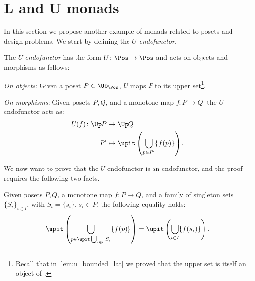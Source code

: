 \section{L and U monads}
In this section we propose another example of monads related to posets and design problems. We start by defining the \emph{$U$ endofunctor}.
\begin{definition}[$U$ endofunctor]
    \label{def:ufunctor}
    The \emph{$U$ endofunctor} has the form $U\colon \Pos \to \Pos$ and acts on objects and morphisms as follows:
    \begin{compactenum}
        \item \emph{On objects}: Given a poset $P\in \Ob_\Pos$, $U$ maps $P$ to its upper set\footnote{Recall that in \cref{lem:u_bounded_lat} we proved that the upper set is itself an object of \Pos.}.
        \item \emph{On morphisms}: Given posets $P,Q$, and a monotone map $f\colon P\to Q$, the $U$ endofunctor acts as:
        \begin{equation}
            \begin{aligned}
                U(f)\colon \Up P&\to \Up Q\\
                P'&\mapsto \upit \left( \bigcup_{p\in P'} \{f(p)\}\right).
            \end{aligned}
        \end{equation}
    \end{compactenum}
\end{definition}
We now want to prove that the $U$ endofunctor is an endofunctor, and the proof requires the following two facts.
\begin{lemma}
    \label{lem:unpack_u_functor}
    Given posets $P,Q$, a monotone map $f\colon P \to Q$, and a family of singleton sets $\{S_i\}_{i\in I}$, with $S_i=\{s_i\}$, $s_i\in P$, the following equality holds:
    \begin{equation}
        \label{eq:lemma_unpack}
        \upit\left( \bigcup_{p\in \upit \bigcup_{i\in I}S_i}\{f(p)\}\right)= \upit \left( \bigcup_{i\in I} \{f(s_i)\}\right).
    \end{equation}
\end{lemma}
